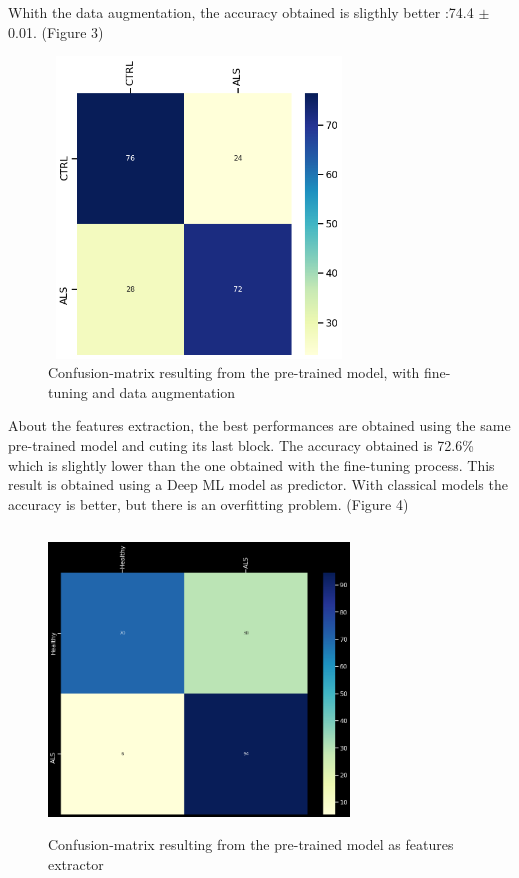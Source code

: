 Whith the data augmentation, the accuracy obtained is sligthly better :74.4 $\pm$ 0.01. (Figure 3)
\begin{figure}[H]
\centering
\caption{Confusion-matrix resulting from the pre-trained model, with fine-tuning and data augmentation}
\includegraphics[width=8cm, height=8cm]{finetuning_data_augmentation_model_results}
\end{figure}

About the features extraction, the best performances are obtained using the same pre-trained model and cuting its last block. The accuracy obtained is 72.6\% which is slightly lower than the one obtained with the fine-tuning process. This result is obtained using a Deep ML model as predictor. With classical models the accuracy is better, but there is an overfitting problem. (Figure 4)
\begin{figure}[H]
\centering
\caption{Confusion-matrix resulting from the pre-trained model as features extractor}
\includegraphics[width=8cm, height=8cm]{extractor_model_results}
\end{figure}

